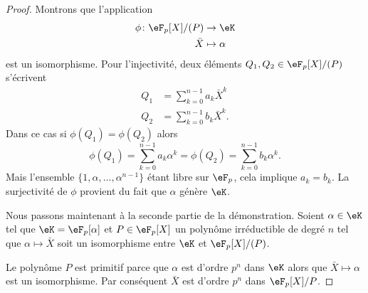 \begin{proof}
    Montrons que l'application
    \begin{equation}
        \begin{aligned}
            \phi\colon \eF_p[X]/(P)&\to \eK \\
            \bar X&\mapsto \alpha
        \end{aligned}
    \end{equation}
    est un isomorphisme. Pour l'injectivité, deux éléments \( Q_1,Q_2\in \eF_p[X]/(P)\) s'écrivent
    \begin{subequations}
        \begin{align}
            Q_1&=\sum_{k=0}^{n-1}a_k\bar X^k\\
            Q_2&=\sum_{k=0}^{n-1}b_k\bar X^k.
        \end{align}
    \end{subequations}
    Dans ce cas si \( \phi(Q_1)=\phi(Q_2)\) alors
    \begin{equation}
        \phi(Q_1)=\sum_{k=0}^{n-1}a_k\alpha^k=\phi(Q_2)=\sum_{k=0}^{n-1}b_k\alpha^k.
    \end{equation}
    Mais l'ensemble \( \{ 1,\alpha,\ldots, \alpha^{n-1} \}\) étant libre sur \( \eF_p\), cela implique \( a_k=b_k\). La surjectivité de \( \phi\) provient du fait que \( \alpha\) génère \( \eK\).

    Nous passons maintenant à la seconde partie de la démonstration. Soient \( \alpha\in \eK\) tel que \( \eK=\eF_p[\alpha]\) et \( P\in \eF_p[X]\) un polynôme irréductible de degré \( n\) tel que \( \alpha\mapsto \bar X\) soit un isomorphisme entre \( \eK\) et \( \eF_p[X]/(P)\).

    Le polynôme \( P\) est primitif parce que \( \alpha\) est d'ordre \( p^n\) dans \( \eK\) alors que \( \bar X\mapsto \alpha\) est un isomorphisme. Par conséquent \( \bar X\) est d'ordre \( p^n\) dans \( \eF_p[X]/P\).


\end{proof}
